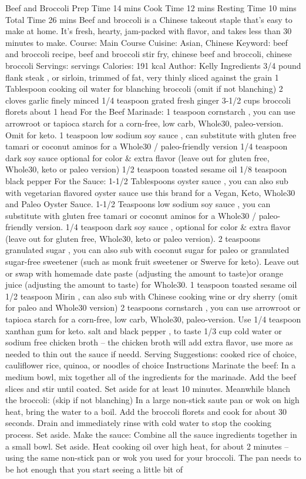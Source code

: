 Beef and Broccoli Prep Time 14 mins Cook Time 12 mins Resting Time 10 mins Total Time 26 mins Beef and broccoli is a Chinese takeout staple that's easy to make at home. It's fresh, hearty, jam-packed with flavor, and takes less than 30 minutes to make. Course: Main Course Cuisine: Asian, Chinese Keyword: beef and broccoli recipe, beef and broccoli stir fry, chinese beef and broccoli, chinese broccoli Servings: servings Calories: 191 kcal Author: Kelly Ingredients 3/4 pound flank steak , or sirloin, trimmed of fat, very thinly sliced against the grain 1 Tablespoon cooking oil water for blanching broccoli (omit if not blanching) 2 cloves garlic finely minced 1/4 teaspoon grated fresh ginger 3-1/2 cups broccoli florets about 1 head For the Beef Marinade: 1 teaspoon cornstarch , you can use arrowroot or tapioca starch for a corn-free, low carb, Whole30, paleo-version. Omit for keto. 1 teaspoon low sodium soy sauce , can substitute with gluten free tamari or coconut aminos for a Whole30 / paleo-friendly version 1/4 teaspoon dark soy sauce optional for color \& extra flavor (leave out for gluten free, Whole30, keto or paleo version) 1/2 teaspoon toasted sesame oil 1/8 teaspoon black pepper For the Sauce: 1-1/2 Tablespoons oyster sauce , you can also sub with vegetarian flavored oyster sauce use this brand for a Vegan, Keto, Whole30 and Paleo Oyster Sauce. 1-1/2 Teaspoons low sodium soy sauce , you can substitute with gluten free tamari or coconut aminos for a Whole30 / paleo-friendly version. 1/4 teaspoon dark soy sauce , optional for color \& extra flavor (leave out for gluten free, Whole30, keto or paleo version). 2 teaspoons granulated sugar , you can also sub with coconut sugar for paleo or granulated sugar-free sweetener (such as monk fruit sweetener or Swerve for keto). Leave out or swap with homemade date paste (adjusting the amount to taste)or orange juice (adjusting the amount to taste) for Whole30. 1 teaspoon toasted sesame oil 1/2 teaspoon Mirin , can also sub with Chinese cooking wine or dry sherry (omit for paleo and Whole30 version) 2 teaspoons cornstarch , you can use arrowroot or tapioca starch for a corn-free, low carb, Whole30, paleo-version. Use 1/4 teaspoon xanthan gum for keto. salt and black pepper , to taste 1/3 cup cold water or sodium free chicken broth – the chicken broth will add extra flavor, use more as needed to thin out the sauce if needd. Serving Suggestions: cooked rice of choice, cauliflower rice, quinoa, or noodles of choice Instructions Marinate the beef: In a medium bowl, mix together all of the ingredients for the marinade. Add the beef slices and stir until coated. Set aside for at least 10 minutes. Meanwhile blanch the broccoli: (skip if not blanching) In a large non-stick saute pan or wok on high heat, bring the water to a boil. Add the broccoli florets and cook for about 30 seconds. Drain and immediately rinse with cold water to stop the cooking process. Set aside. Make the sauce: Combine all the sauce ingredients together in a small bowl. Set aside. Heat cooking oil over high heat, for about 2 minutes – using the same non-stick pan or wok you used for your broccoli. The pan needs to be hot enough that you start seeing a little bit of 